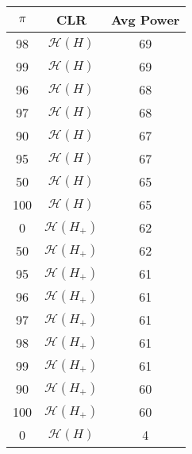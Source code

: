 \centering \begin{tabular}{c|c|c}
$\pi$	&CLR	&Avg Power\\\hline
98	&$\mathcal{H}(H)$	&69\\
99	&$\mathcal{H}(H)$	&69\\
96	&$\mathcal{H}(H)$	&68\\
97	&$\mathcal{H}(H)$	&68\\
90	&$\mathcal{H}(H)$	&67\\
95	&$\mathcal{H}(H)$	&67\\
50	&$\mathcal{H}(H)$	&65\\
100	&$\mathcal{H}(H)$	&65\\
0	&$\mathcal{H}(H_+)$	&62\\
50	&$\mathcal{H}(H_+)$	&62\\
95	&$\mathcal{H}(H_+)$	&61\\
96	&$\mathcal{H}(H_+)$	&61\\
97	&$\mathcal{H}(H_+)$	&61\\
98	&$\mathcal{H}(H_+)$	&61\\
99	&$\mathcal{H}(H_+)$	&61\\
90	&$\mathcal{H}(H_+)$	&60\\
100	&$\mathcal{H}(H_+)$	&60\\
0	&$\mathcal{H}(H)$	&4\\
\end{tabular}
